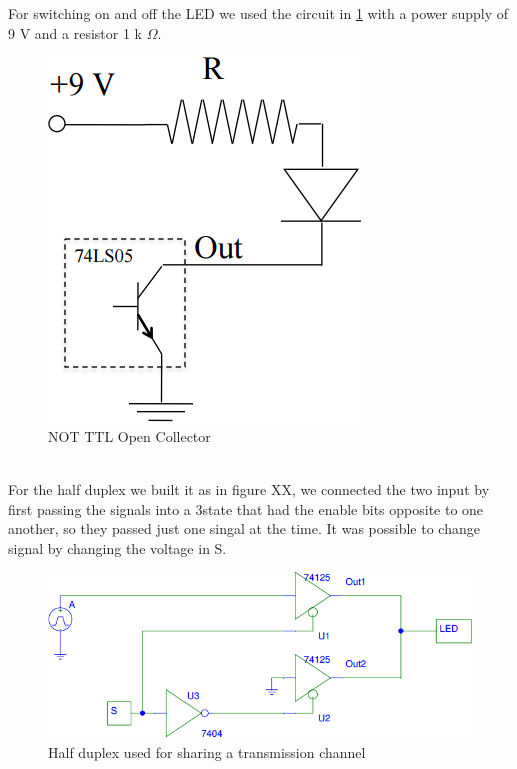For switching on and off the LED we used the circuit in \ref{LED_ON_OFF} with a power supply of 9 V and a resistor 1  k $\Omega$.
\begin{figure}[H]
\centering
\includegraphics[width=.7\textwidth]{10/LED_ON_OFF.png}
\caption{NOT TTL Open Collector}\label{LED_ON_OFF}
\end{figure}

\\
For the half duplex we built it as in figure XX, we connected the two input by first passing the signals into a  3state that had the enable bits opposite to one another, so they passed just one singal at the time. It was possible to change signal by changing the voltage in S.
\begin{figure}[H]
\centering
\includegraphics[width=.7\textwidth]{10/TTL_3state.png}
\caption{Half duplex used for sharing a transmission channel}\label{TTL_3state}
\end{figure}

